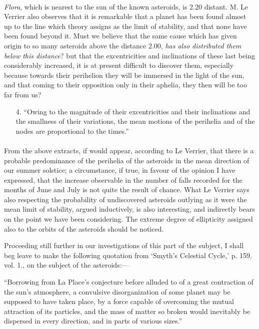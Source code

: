 \documentclass[a4paper, 12pt, oneside]{article}
\begin{document}
\paragraph{}
\emph{Flora}, which is nearest to the sun of the known asteroids, is 2.20 distant. M. Le Verrier also observes that it is remarkable that a planet has been found almost up to the line which theory assigns as the limit of stability, and that none have been found beyond it. Must we believe that the same cause which has given origin to so many asteroids above the distance 2.00, \emph{has also distributed them below this distance}? but that the excentricities and inclinations of these last being considerably increased, it is at present difficult to discover them, especially because towards their perihelion they will be immersed in the light of the sun, and that coming to their opposition only in their aphelia, they then will be too far from us?
\begin{enumerate}
    \item[4.] ``Owing to the magnitude of their excentricities and their inclinations and the smallness of their variations, the mean motions of the perihelia and of the nodes are proportional to the times.''
\end{enumerate}
\paragraph{}
From the above extracts, if would appear, according to Le Verrier, that there is a probable predominance of the perihelia of the asteroids in the mean direction of our summer solstice; a circumstance, if true, in favour of the opinion I have expressed, that the increase observable in the number of falls recorded for the months of June and July is not quite the result of chance. What Le Verrier says also respecting the probability of undiscovered asteroids outlying as it were the mean limit of stability, argued inductively, is also interesting, and indirectly bears on the point we have been considering. The extreme degree of ellipticity assigned also to the orbits of the asteroids should be noticed.

Proceeding still further in our investigations of this part of the subject, I shall beg leave to make the following quotation from `Smyth's Celestial Cycle,' p. 159. vol. 1., on the subject of the asteroids:---

``Borrowing from La Place's conjecture before alluded to of a great contraction of the sun's atmosphere, a convulsive disorganization of some planet may be supposed to have taken place, by a force capable of overcoming the mutual attraction of its particles, and the mass of matter so broken would inevitably be dispersed in every direction, and in parts of various sizes.''
\end{document}
